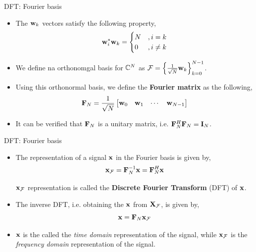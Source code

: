 \documentclass[aspectratio=169]{beamer}
\let\olditem\item
\renewcommand{\item}{\setlength{\itemsep}{\fill}\olditem}
\def\mf{\ensuremath\mathbf}
\def\mb{\ensuremath\mathbb}
\def\mc{\ensuremath\mathcal}
\def\lc{\ensuremath\left\{}
\def\rc{\ensuremath\right\}}
\def\bmx{\ensuremath\begin{bmatrix*}[r]}
\def\emx{\ensuremath\end{bmatrix*}}
\begin{document}
\begin{frame}[t]{DFT: Fourier basis}
  \begin{itemize}
    \item The $\mf{w}_k$ vectors satisfy the following property,
    \[ \mf{w}_i^*\mf{w}_k = \begin{cases} N &, i = k \\ 0 &, i \neq k \end{cases} \]

    \item We define na orthonomgal basis for $\mb{C}^N$ as $\mc{F} = \lc \frac{1}{\sqrt{N}} \mf{w}_k \rc_{k=0}^{N-1}$.
    
    \item Using this orthonormal basis, we define the \textbf{Fourier matrix} as the following,
    \[ \mf{F}_N = \frac{1}{\sqrt{N}} \bmx \mf{w}_0 & \mf{w}_1 & \cdots & \mf{w}_{N-1} \emx \]

    \item It can be verified that $\mf{F}_N$ is a unitary matrix, i.e. $\mf{F}_N^H \mf{F}_N = \mf{I}_N$.
  \end{itemize}
\end{frame}


\begin{frame}[t]{DFT: Fourier basis}
  \begin{itemize}
    \item The representation of a signal $\mf{x}$ in the Fourier basis is given by,
    \[ \mf{x}_{\mc{F}} = \mf{F}_{N}^{-1} \mf{x} = \mf{F}_N^H \mf{x} \]

    $\mf{x}_{\mc{F}}$ representation is called the \textbf{Discrete Fourier Transform} (DFT) of $\mf{x}$.

    \item The inverse DFT, i.e. obtaining the $\mf{x}$ from $\mf{X}_{\mc{F}}$, is given by,
    \[ \mf{x} = \mf{F}_N \mf{x}_{\mc{F}} \]

    \item $\mf{x}$ is the called the \textit{time domain} representation of the signal, while $\mf{x}_{\mc{F}}$ is the \textit{frequency domain} representation of the signal.
  \end{itemize}
\end{frame}
\end{document}
